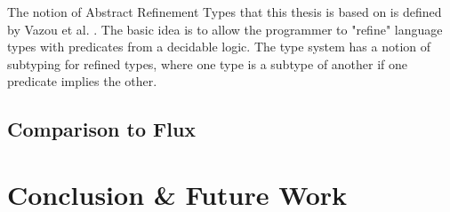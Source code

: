 \documentclass{book}
\theoremstyle{definition}
\begin{document}
The notion of Abstract Refinement Types that this thesis is based on is defined by Vazou et al. \cite{vazou_abstract_2013}. The basic idea is to allow the programmer to "refine" language types with predicates from a decidable logic. The type system has a notion of subtyping for refined types, where one type is a subtype of another if one predicate implies the other.

\section{Comparison to Flux}

\chapter{Conclusion \& Future Work}

\printbibliography
\end{document}
